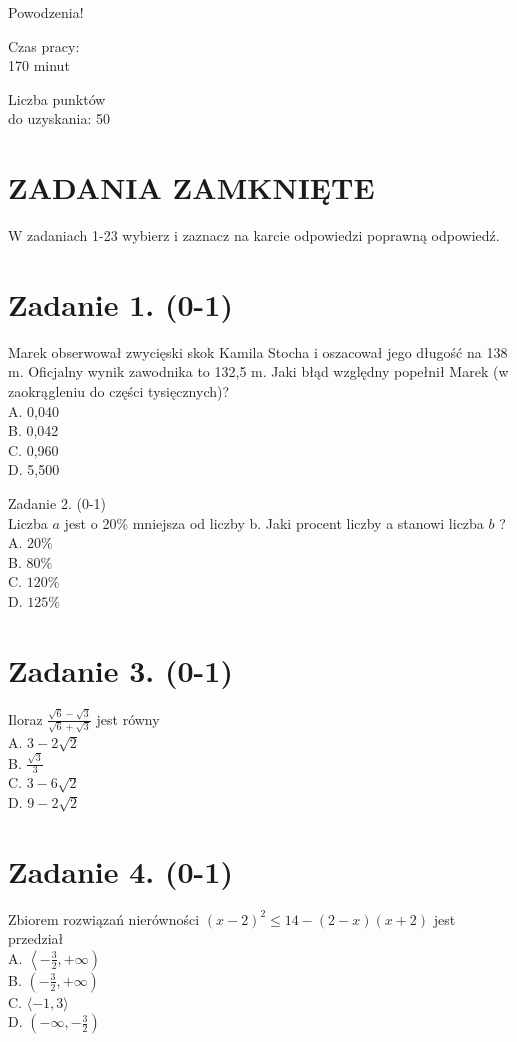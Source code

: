 \documentclass[10pt]{article}
\begin{document}
Powodzenia!

Czas pracy:\\
170 minut

Liczba punktów\\
do uzyskania: 50

\section*{ZADANIA ZAMKNIĘTE}
W zadaniach 1-23 wybierz i zaznacz na karcie odpowiedzi poprawną odpowiedź.

\section*{Zadanie 1. (0-1)}
Marek obserwował zwycięski skok Kamila Stocha i oszacował jego długość na 138 m. Oficjalny wynik zawodnika to 132,5 m. Jaki błąd względny popełnił Marek (w zaokrągleniu do części tysięcznych)?\\
A. 0,040\\
B. 0,042\\
C. 0,960\\
D. 5,500

Zadanie 2. (0-1)\\
Liczba \(a\) jest o 20\% mniejsza od liczby b. Jaki procent liczby a stanowi liczba \(b\) ?\\
A. \(20 \%\)\\
B. \(80 \%\)\\
C. \(120 \%\)\\
D. \(125 \%\)

\section*{Zadanie 3. (0-1)}
Iloraz \(\frac{\sqrt{6}-\sqrt{3}}{\sqrt{6}+\sqrt{3}}\) jest równy\\
A. \(3-2 \sqrt{2}\)\\
B. \(\frac{\sqrt{3}}{3}\)\\
C. \(3-6 \sqrt{2}\)\\
D. \(9-2 \sqrt{2}\)

\section*{Zadanie 4. (0-1)}
Zbiorem rozwiązań nierówności \((x-2)^{2} \leqslant 14-(2-x)(x+2)\) jest przedział\\
A. \(\left\langle-\frac{3}{2},+\infty\right)\)\\
B. \(\left(-\frac{3}{2},+\infty\right)\)\\
C. \(\langle-1,3\rangle\)\\
D. \(\left(-\infty,-\frac{3}{2}\right)\)
\end{document}
